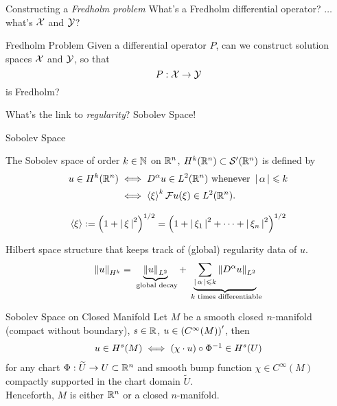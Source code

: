 \documentclass{beamer}
\begin{document}
\begin{frame}{Constructing a \textit{Fredholm problem}} 
What's a Fredholm differential operator? $\dots $ what's $\X$ and $\Y$? 
\begin{block}{Fredholm Problem}
    Given a differential operator $P$, can we construct solution spaces $\X$ and $ \Y$,  so that $$P : \X \to \Y$$ is Fredholm? 
\end{block}
\pause 

What's the link to \textit{regularity}? Sobolev Space! 

\end{frame} 

\begin{frame}{Sobolev Space}
\begin{definition}
    The Sobolev space of order $k \in \N$ on $\R^n$,  $H^k(\R^n) \subset \sch'(\R^n)$  is defined by 
    \begin{align*}
    u \in H^k(\R^n) 
    &\iff D^\alpha u \in L^2(\R^n) \text{ whenever } \abs{\alpha} \leq k\\
    &\iff \sym[\xi]^k \F u (\xi) \in L^2(\R^n). 
    \end{align*}
\end{definition}

\begin{align*}
\sym[\xi] &:= \brac{1 + \abs{\xi}^2}^{1/2} = \brac{1 + \abs{\xi_1}^2+ \dots + \abs{\xi_n}^2}^{1/2} \\
\end{align*}

Hilbert space structure that keeps track of (global) regularity data of $u$. 
\begin{align*}
    \norm[u]_{H^k} = \underbrace{\norm[u]_{L^2}}_{\text{ global decay}}  + \underbrace{\sum_{\abs{\alpha} \leq k} \norm[D^\alpha u ]_{L^2} }_{\text{ $k$ times differentiable}} 
\end{align*}

\end{frame} 


\begin{frame}{Sobolev Space on Closed Manifold}
Let $M$ be a smooth closed $n$-manifold (compact without boundary), $s \in \R$, $u \in \brac{C^\infty(M)}'$, then 
\begin{align*}
u \in H^s(M) \iff \brac{\chi \cdot  u} \circ \Phi^{-1} \in H^s(U)
\end{align*} 
for any chart $\Phi : \widetilde{U} \to U \subset \R^n$ and smooth bump function $\chi \in C^\infty(M)$ compactly supported in the chart domain $\widetilde{U}$. \\[3em]
\pause 
Henceforth, $M$ is either $\R^n$ or a closed $n$-manifold. 
\end{frame} 
\end{document}
